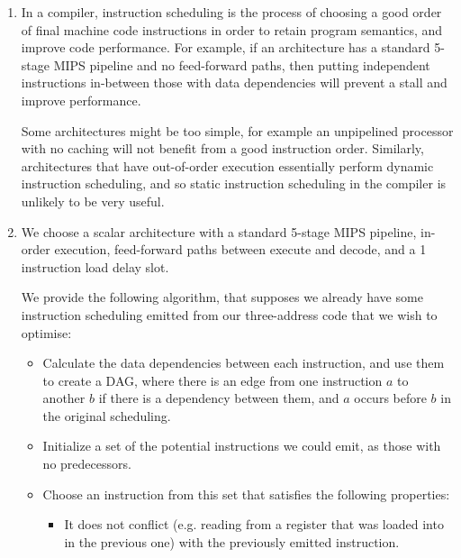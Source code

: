 


\begin{enumerate}[label=(\alph*)]
  \item

    In a compiler, instruction scheduling is the process of choosing a good order of final machine code instructions in order to retain program semantics, and improve code performance. For example, if an architecture has a standard 5-stage MIPS pipeline and no feed-forward paths, then putting independent instructions in-between those with data dependencies will prevent a stall and improve performance.

    Some architectures might be too simple, for example an unpipelined processor with no caching will not benefit from a good instruction order. Similarly, architectures that have out-of-order execution  essentially perform dynamic instruction scheduling, and so static instruction scheduling in the compiler is unlikely to be very useful.

  \item
    We choose a scalar architecture with a standard 5-stage MIPS pipeline, in-order execution, feed-forward paths between execute and decode, and a 1 instruction load delay slot.

    We provide the following algorithm, that supposes we already have some instruction scheduling emitted from our three-address code that we wish to optimise:

    \begin{itemize}
      \item
        Calculate the data dependencies between each instruction, and use them to create a DAG, where there is an edge from one instruction $a$ to another $b$ if there is a dependency between them, and $a$ occurs before $b$ in the original scheduling.

      \item
        Initialize a set of the potential instructions we could emit, as those with no predecessors.

      \item
        Choose an instruction from this set that satisfies the following properties:

        \begin{itemize}
          \item
            It does not conflict (e.g. reading from a register that was loaded into in the previous one) with the previously emitted instruction.


\end{itemize}
\end{itemize}
\end{enumerate}
